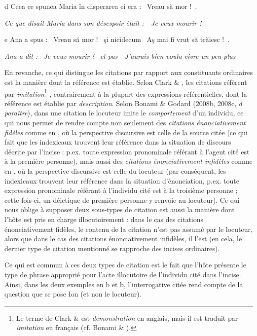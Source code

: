   d  Ceea ce spunea Maria în disperarea ei era : {\guillemotleft}~Vreau să mor !~{\guillemotright}.

{\itshape
Ce que disait Maria dans son désespoir était :~{\guillemotleft}~Je veux mourir !~{\guillemotright}}

  e  Ana a spus : {\guillemotleft}~Vreau să mor !~{\guillemotright} şi nicidecum {\guillemotleft}~Aş mai fi vrut să trăiesc !~{\guillemotright}.

    \textit{Ana a dit : {\guillemotleft}~Je veux mourir !~{\guillemotright} et pas~{\guillemotleft}~J'aurais bien voulu vivre un peu plus~{\guillemotright}}

En revanche, ce qui distingue les citations par rapport aux constituants ordinaires est la manière dont la référence est établie. Selon Clark \& \citet{Gerrig1990}, les citations réfèrent par \textit{imitation}\footnote{Le terme de Clark \& \citet{Gerrig1990} est \textit{demonstration} en anglais, mais il est traduit par \textit{imitation} en français (cf. Bonami \& \citet{Godard2008b}).} , contrairement à la plupart des expressions référentielles, dont la référence est établie par \textit{description}. Selon Bonami \& Godard (2008b, 2008c, \textit{à paraître}), dans une citation le locuteur imite le \textit{comportement} d'un individu, ce qui nous permet de rendre compte non seulement des \textit{citations énonciativement fidèles} comme en , où la perspective discursive est celle de la source citée (ce qui fait que les indexicaux trouvent leur référence dans la situation de discours décrite par l'incise : p.ex. toute expression pronominale référant à l'agent cité est à la première  personne), mais aussi des \textit{citations énonciativement infidèles} comme en , où la perspective discursive est celle du locuteur (par conséquent, les indexicaux trouvent leur référence dans la situation d'énonciation, p.ex. toute expression pronominale référant à l'individu cité est à la troisième personne ; cette fois-ci, un déictique de première personne y renvoie au locuteur). Ce qui nous oblige à supposer deux sous-types de citation est aussi la manière dont l'hôte est pris en charge illocutoirement : dans le cas des citations énonciativement fidèles, le contenu de la citation n'est pas assumé par le locuteur, alors que dans le cas des citations énonciativement infidèles, il l'est (en cela, le dernier type de citation mentionné se rapproche des incises ordinaires). 

Ce qui est commun à ces deux types de citation est le fait que l'hôte présente le type de phrase approprié pour l'acte illocutoire de l'individu cité dans l'incise. Ainsi, dans les deux exemples en b et b, l'interrogative citée rend compte de la question que se pose Ion (et non le locuteur). 

